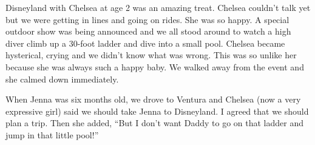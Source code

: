 Disneyland with Chelsea at age 2 was an amazing treat. Chelsea couldn't talk yet
but we were getting in lines and going on rides. She was so happy.  A special
outdoor show was being announced and we all stood around to watch a high diver
climb up a 30-foot ladder and dive into a small pool. Chelsea became
hysterical, crying and we didn't know what was wrong. This was so unlike her
because she was always such a happy baby. We walked away from the event and she
calmed down immediately. 
\begin{window}
\smallskip
\end{window}
When Jenna was six months old, we drove to Ventura
and Chelsea (now a very expressive girl) said we should take Jenna to
Disneyland. I agreed that we should plan a trip. Then she added, ``But I don't
want Daddy to go on that ladder and jump in that little pool!''
